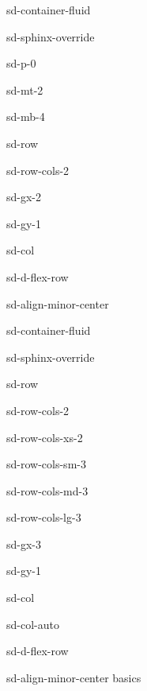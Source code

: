 \documentclass[letterpaper,10pt,italian]{jupyterBook}
\begin{document}
\sphinxAtStartPar
{} 

\sphinxAtStartPar
{} 

\sphinxstepscope

\begin{sphinxuseclass}{sd-container-fluid}
\begin{sphinxuseclass}{sd-sphinx-override}
\begin{sphinxuseclass}{sd-p-0}
\begin{sphinxuseclass}{sd-mt-2}
\begin{sphinxuseclass}{sd-mb-4}
\begin{sphinxuseclass}{sd-row}
\begin{sphinxuseclass}{sd-row-cols-2}
\begin{sphinxuseclass}{sd-gx-2}
\begin{sphinxuseclass}{sd-gy-1}
\begin{sphinxuseclass}{sd-col}
\begin{sphinxuseclass}{sd-d-flex-row}
\begin{sphinxuseclass}{sd-align-minor-center}
\begin{sphinxuseclass}{sd-container-fluid}
\begin{sphinxuseclass}{sd-sphinx-override}
\begin{sphinxuseclass}{sd-row}
\begin{sphinxuseclass}{sd-row-cols-2}
\begin{sphinxuseclass}{sd-row-cols-xs-2}
\begin{sphinxuseclass}{sd-row-cols-sm-3}
\begin{sphinxuseclass}{sd-row-cols-md-3}
\begin{sphinxuseclass}{sd-row-cols-lg-3}
\begin{sphinxuseclass}{sd-gx-3}
\begin{sphinxuseclass}{sd-gy-1}
\begin{sphinxuseclass}{sd-col}
\begin{sphinxuseclass}{sd-col-auto}
\begin{sphinxuseclass}{sd-d-flex-row}
\begin{sphinxuseclass}{sd-align-minor-center}
\sphinxAtStartPar
basics


\end{sphinxuseclass}
\end{sphinxuseclass}
\end{sphinxuseclass}
\end{sphinxuseclass}
\end{sphinxuseclass}
\end{sphinxuseclass}
\end{sphinxuseclass}
\end{sphinxuseclass}
\end{sphinxuseclass}
\end{sphinxuseclass}
\end{sphinxuseclass}
\end{sphinxuseclass}
\end{sphinxuseclass}
\end{sphinxuseclass}
\end{sphinxuseclass}
\end{sphinxuseclass}
\end{sphinxuseclass}
\end{sphinxuseclass}
\end{sphinxuseclass}
\end{sphinxuseclass}
\end{sphinxuseclass}
\end{sphinxuseclass}
\end{sphinxuseclass}
\end{sphinxuseclass}
\end{sphinxuseclass}
\end{sphinxuseclass}
\end{document}
